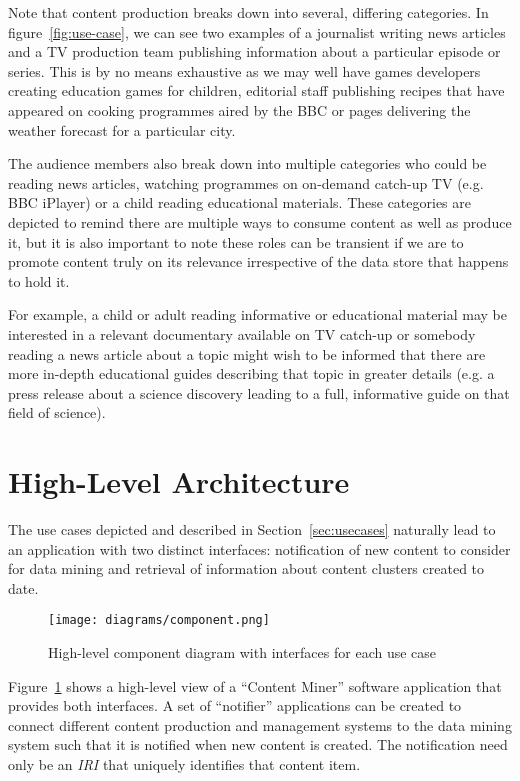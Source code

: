 Note that content production breaks down into several, differing
categories. In figure~\ref{fig:use-case}, we can see two examples of
a journalist writing news articles and a TV production team
publishing information about a particular episode or series. This is
by no means exhaustive as we may well have games developers creating
education games for children, editorial staff publishing recipes that
have appeared on cooking programmes aired by the BBC or pages
delivering the weather forecast for a particular city.

The audience members also break down into multiple categories who
could be reading news articles, watching programmes on on-demand
catch-up TV (e.g. BBC iPlayer) or a child reading educational materials.
These categories are depicted to remind there are multiple ways to
consume content as well as produce it, but it is also important to
note these roles can be transient if we are to promote content truly
on its relevance irrespective of the data store that happens to hold
it.

For example, a child or adult reading informative or educational
material may be interested in a relevant documentary available on
TV catch-up or somebody reading a news article about a topic might
wish to be informed that there are more in-depth educational guides
describing that topic in greater details (e.g. a press release about
a science discovery leading to a full, informative guide on that
field of science).

\section{High-Level Architecture}

The use cases depicted and described in Section~\ref{sec:usecases} naturally
lead to an application with two distinct interfaces: notification of new
content to consider for data mining and retrieval of information about content
clusters created to date.

\begin{figure}[h]
  \begin{center}
    \texttt{[image: diagrams/component.png]}
  \end{center}
  \caption{High-level component diagram with interfaces for each use case\label{fig:component}}
\end{figure}

Figure~\ref{fig:component} shows a high-level view of a ``Content Miner''
software application that provides both interfaces. A set of ``notifier''
applications can be created to connect different content production and
management systems to the data mining system such that it is notified when new
content is created. The notification need only be an \emph{IRI} that uniquely
identifies that content item.

